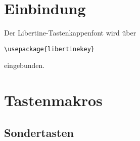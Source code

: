 \documentclass[ngerman]{libertinedoku}
\begin{document}

\section{Einbindung}

Der Libertine-Tastenkappenfont wird über

\verb|\usepackage{libertinekey}|

eingebunden.

\section{Tastenmakros}

\subsection{Sondertasten}
\end{document}
